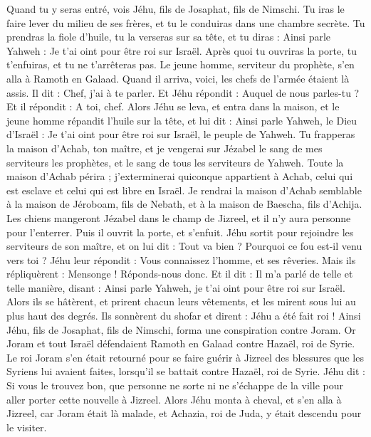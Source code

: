 \begin{multicols}{2}
Quand tu y seras entré, vois Jéhu, fils de Josaphat, fils de Nimschi. Tu iras le faire lever du milieu de ses frères, et tu le conduiras dans une chambre secrète.
Tu prendras la fiole d’huile, tu la verseras sur sa tête, et tu diras : Ainsi parle Yahweh : Je t’ai oint pour être roi sur Israël. Après quoi tu ouvriras la porte, tu t’enfuiras, et tu ne t’arrêteras pas.
Le jeune homme, serviteur du prophète, s’en alla à Ramoth en Galaad.
Quand il arriva, voici, les chefs de l’armée étaient là assis. Il dit : Chef, j’ai à te parler. Et Jéhu répondit : Auquel de nous parles-tu ? Et il répondit : A toi, chef.
Alors Jéhu se leva, et entra dans la maison, et le jeune homme répandit l’huile sur la tête, et lui dit : Ainsi parle Yahweh, le Dieu d’Israël : Je t’ai oint pour être roi sur Israël, le peuple de Yahweh.
Tu frapperas la maison d’Achab, ton maître, et je vengerai sur Jézabel le sang de mes serviteurs les prophètes, et le sang de tous les serviteurs de Yahweh.
Toute la maison d’Achab périra ; j’exterminerai quiconque appartient à Achab, celui qui est esclave et celui qui est libre en Israël.
Je rendrai la maison d’Achab semblable à la maison de Jéroboam, fils de Nebath, et à la maison de Baescha, fils d’Achija.
Les chiens mangeront Jézabel dans le champ de Jizreel, et il n’y aura personne pour l’enterrer. Puis il ouvrit la porte, et s’enfuit.
Jéhu sortit pour rejoindre les serviteurs de son maître, et on lui dit : Tout va bien ? Pourquoi ce fou est-il venu vers toi ? Jéhu leur répondit : Vous connaissez l’homme, et ses rêveries.
Mais ils répliquèrent : Mensonge ! Réponds-nous donc. Et il dit : Il m’a parlé de telle et telle manière, disant : Ainsi parle Yahweh, je t’ai oint pour être roi sur Israël.
Alors ils se hâtèrent, et prirent chacun leurs vêtements, et les mirent sous lui au plus haut des degrés. Ils sonnèrent du shofar et dirent : Jéhu a été fait roi !
Ainsi Jéhu, fils de Josaphat, fils de Nimschi, forma une conspiration contre Joram. Or Joram et tout Israël défendaient Ramoth en Galaad contre Hazaël, roi de Syrie.
Le roi Joram s’en était retourné pour se faire guérir à Jizreel des blessures que les Syriens lui avaient faites, lorsqu’il se battait contre Hazaël, roi de Syrie. Jéhu dit : Si vous le trouvez bon, que personne ne sorte ni ne s’échappe de la ville pour aller porter cette nouvelle à Jizreel.
Alors Jéhu monta à cheval, et s’en alla à Jizreel, car Joram était là malade, et Achazia, roi de Juda, y était descendu pour le visiter.

\end{multicols}
